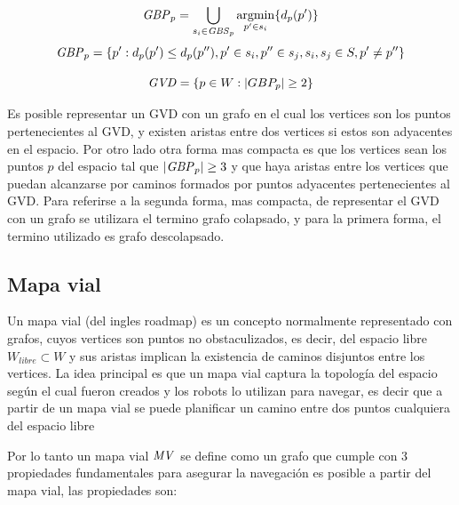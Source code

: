 \begin{equation}
  \mathit{GBP}_p =\bigcup_{s_i \in \mathit{GBS}_p} \operatorname*{argmin}_{p'\in s_i}\{d_p(p')\}\label{eq:GBP}
\end{equation}
\begin{equation}
  \mathit{GBP}_p =\{p' : d_p(p') \leq d_p(p''), p' \in s_i, p'' \in s_j, s_i,s_j \in S,p' \neq p''\}
\end{equation}

\begin{equation}
  \mathit{GVD}  = \{p \in W : |GBP_p| \geq 2\}\label{eq:GVD}
\end{equation}


Es posible representar un GVD con un grafo en el cual los vertices son los puntos pertenecientes al GVD, y existen aristas entre dos vertices si estos son adyacentes en el espacio. Por otro lado otra forma mas compacta es que los vertices sean los puntos $p$ del espacio tal que $|\mathit{GBP}_p|\geq 3$ y que haya aristas entre los vertices que puedan alcanzarse por caminos formados por puntos adyacentes pertenecientes al GVD. Para referirse a la segunda forma, mas compacta, de representar el GVD con un grafo se utilizara el termino grafo colapsado, y para la primera forma, el termino utilizado es grafo descolapsado.

\subsection{Mapa vial}\cite{choset2005principles}
Un mapa vial (del ingles roadmap) es un concepto normalmente representado con grafos, cuyos vertices son puntos no obstaculizados, es decir, del espacio libre $W_{libre} \subset W$ y sus aristas implican la existencia de caminos disjuntos entre los vertices. La idea principal es que un mapa vial captura la topología del espacio según el cual fueron creados y los robots lo utilizan para navegar, es decir que a partir de un mapa vial se puede planificar un camino entre dos puntos cualquiera del espacio libre 

Por lo tanto un mapa vial $\mathit{MV}$ se define como un grafo que cumple con 3 propiedades fundamentales para asegurar la navegación es posible a partir del mapa vial, las propiedades son:

